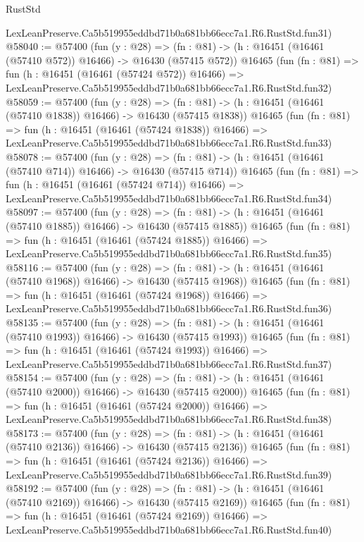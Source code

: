 \begin{lexlean}{RustStd}
\begin{coremodule}
    LexLeanPreserve.Ca5b519955eddbd71b0a681bb66ecc7a1.R6.RustStd.fun31)
@58040 := @57400
    (fun (y : @28) =>
    (fn : @81) -> (h : @16451 (@16461 (@57410 @572)) @16466) -> @16430 (@57415 @572))
    @16465
    (fun (fn : @81) =>
    fun (h : @16451 (@16461 (@57424 @572)) @16466) =>
    LexLeanPreserve.Ca5b519955eddbd71b0a681bb66ecc7a1.R6.RustStd.fun32)
@58059 := @57400
    (fun (y : @28) =>
    (fn : @81) -> (h : @16451 (@16461 (@57410 @1838)) @16466) -> @16430 (@57415 @1838))
    @16465
    (fun (fn : @81) =>
    fun (h : @16451 (@16461 (@57424 @1838)) @16466) =>
    LexLeanPreserve.Ca5b519955eddbd71b0a681bb66ecc7a1.R6.RustStd.fun33)
@58078 := @57400
    (fun (y : @28) =>
    (fn : @81) -> (h : @16451 (@16461 (@57410 @714)) @16466) -> @16430 (@57415 @714))
    @16465
    (fun (fn : @81) =>
    fun (h : @16451 (@16461 (@57424 @714)) @16466) =>
    LexLeanPreserve.Ca5b519955eddbd71b0a681bb66ecc7a1.R6.RustStd.fun34)
@58097 := @57400
    (fun (y : @28) =>
    (fn : @81) -> (h : @16451 (@16461 (@57410 @1885)) @16466) -> @16430 (@57415 @1885))
    @16465
    (fun (fn : @81) =>
    fun (h : @16451 (@16461 (@57424 @1885)) @16466) =>
    LexLeanPreserve.Ca5b519955eddbd71b0a681bb66ecc7a1.R6.RustStd.fun35)
@58116 := @57400
    (fun (y : @28) =>
    (fn : @81) -> (h : @16451 (@16461 (@57410 @1968)) @16466) -> @16430 (@57415 @1968))
    @16465
    (fun (fn : @81) =>
    fun (h : @16451 (@16461 (@57424 @1968)) @16466) =>
    LexLeanPreserve.Ca5b519955eddbd71b0a681bb66ecc7a1.R6.RustStd.fun36)
@58135 := @57400
    (fun (y : @28) =>
    (fn : @81) -> (h : @16451 (@16461 (@57410 @1993)) @16466) -> @16430 (@57415 @1993))
    @16465
    (fun (fn : @81) =>
    fun (h : @16451 (@16461 (@57424 @1993)) @16466) =>
    LexLeanPreserve.Ca5b519955eddbd71b0a681bb66ecc7a1.R6.RustStd.fun37)
@58154 := @57400
    (fun (y : @28) =>
    (fn : @81) -> (h : @16451 (@16461 (@57410 @2000)) @16466) -> @16430 (@57415 @2000))
    @16465
    (fun (fn : @81) =>
    fun (h : @16451 (@16461 (@57424 @2000)) @16466) =>
    LexLeanPreserve.Ca5b519955eddbd71b0a681bb66ecc7a1.R6.RustStd.fun38)
@58173 := @57400
    (fun (y : @28) =>
    (fn : @81) -> (h : @16451 (@16461 (@57410 @2136)) @16466) -> @16430 (@57415 @2136))
    @16465
    (fun (fn : @81) =>
    fun (h : @16451 (@16461 (@57424 @2136)) @16466) =>
    LexLeanPreserve.Ca5b519955eddbd71b0a681bb66ecc7a1.R6.RustStd.fun39)
@58192 := @57400
    (fun (y : @28) =>
    (fn : @81) -> (h : @16451 (@16461 (@57410 @2169)) @16466) -> @16430 (@57415 @2169))
    @16465
    (fun (fn : @81) =>
    fun (h : @16451 (@16461 (@57424 @2169)) @16466) =>
    LexLeanPreserve.Ca5b519955eddbd71b0a681bb66ecc7a1.R6.RustStd.fun40)

\end{coremodule}
\end{lexlean}

